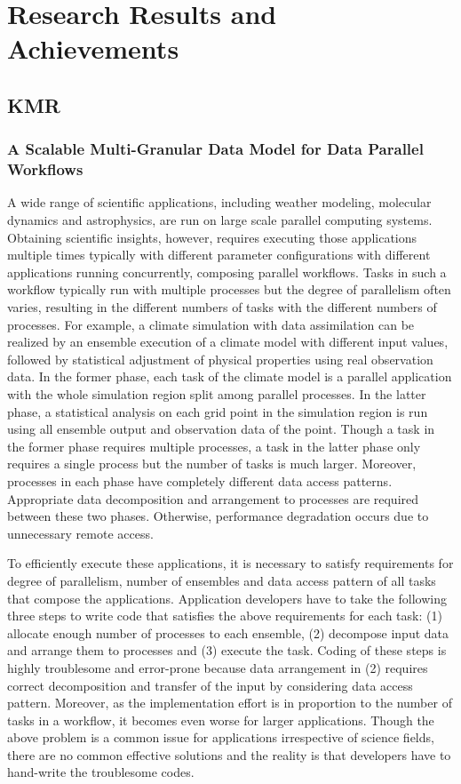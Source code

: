 \documentclass{book}
\begin{document}
\section{Research Results and Achievements}

\subsection{KMR}

\subsubsection{A Scalable Multi-Granular Data Model for Data Parallel Workflows}

A wide range of scientific applications, including weather modeling, molecular dynamics and astrophysics, are run on large scale parallel computing systems.
Obtaining scientific insights, however, requires executing those applications multiple times typically with different parameter configurations with different applications running concurrently, composing parallel workflows.
Tasks in such a workflow typically run with multiple processes but the degree of parallelism often varies, resulting in the different numbers of tasks with the different numbers of processes.
For example, a climate simulation with data assimilation can be realized by an ensemble execution of a climate model with different input values, followed by statistical adjustment of physical properties using real observation data.
In the former phase, each task of the climate model is a parallel application with the whole simulation region split among parallel processes.
In the latter phase, a statistical analysis on each grid point in the simulation region is run using all ensemble output and observation data of the point.
Though a task in the former phase requires multiple processes, a task in the latter phase only requires a single process but the number of tasks is much larger.
Moreover, processes in each phase have completely different data access patterns.
Appropriate data decomposition and arrangement to processes are required between these two phases.
Otherwise, performance degradation occurs due to unnecessary remote access.

To efficiently execute these applications, it is necessary to satisfy requirements for degree of parallelism, number of ensembles and data access pattern of all tasks that compose the applications.
Application developers have to take the following three steps to write code that satisfies the above requirements for each task: (1) allocate enough number of processes to each ensemble, (2) decompose input data and arrange them to processes and (3) execute the task.
Coding of these steps is highly troublesome and error-prone because data arrangement in (2) requires correct decomposition and transfer of the input by considering data access pattern.
Moreover, as the implementation effort is in proportion to the number of tasks in a workflow, it becomes even worse for larger applications.
Though the above problem is a common issue for applications irrespective of science fields, there are no common effective solutions and the reality is that developers have to hand-write the troublesome codes.
\end{document}
